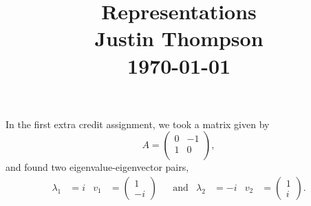 \documentclass{article}
\begin{document}
 
 
 
\title{
    \textmd{\Huge{Representations}}\\
    \vspace{0.1in}
    \textbf{Justin Thompson}\\
    \normalsize\vspace{0.1in}\today\\
    \date{}
}


\maketitle

In the first extra credit assignment, we took a matrix given by $$A = \begin{pmatrix} 0 & -1\\1 & 0\\ \end{pmatrix},$$ and found two eigenvalue-eigenvector pairs, 
\begin{align*}
\lambda_1 &= i
&
v_1 &= \begin{pmatrix}1\\-i\end{pmatrix}
&
&\text{and}
&
\lambda_2 &= -i
&
v_2 &= \begin{pmatrix}1\\i\end{pmatrix}.
\end{align*}
\end{document}
